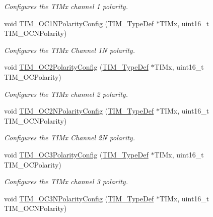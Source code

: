 \begin{DoxyCompactItemize}
\begin{DoxyCompactList}\small\item\em Configures the T\+I\+Mx channel 1 polarity. \end{DoxyCompactList}\item 
void \mbox{\hyperlink{group___t_i_m___exported___functions_ga3cb91578e7dd34ea7d09862482960445}{T\+I\+M\+\_\+\+O\+C1\+N\+Polarity\+Config}} (\mbox{\hyperlink{struct_t_i_m___type_def}{T\+I\+M\+\_\+\+Type\+Def}} $\ast$T\+I\+Mx, uint16\+\_\+t T\+I\+M\+\_\+\+O\+C\+N\+Polarity)
\begin{DoxyCompactList}\small\item\em Configures the T\+I\+Mx Channel 1N polarity. \end{DoxyCompactList}\item 
void \mbox{\hyperlink{group___t_i_m___exported___functions_ga6831cacaac1ef50291af94db94450797}{T\+I\+M\+\_\+\+O\+C2\+Polarity\+Config}} (\mbox{\hyperlink{struct_t_i_m___type_def}{T\+I\+M\+\_\+\+Type\+Def}} $\ast$T\+I\+Mx, uint16\+\_\+t T\+I\+M\+\_\+\+O\+C\+Polarity)
\begin{DoxyCompactList}\small\item\em Configures the T\+I\+Mx channel 2 polarity. \end{DoxyCompactList}\item 
void \mbox{\hyperlink{group___t_i_m___exported___functions_ga2fa6ea3a89f446b52b4e699272b70cad}{T\+I\+M\+\_\+\+O\+C2\+N\+Polarity\+Config}} (\mbox{\hyperlink{struct_t_i_m___type_def}{T\+I\+M\+\_\+\+Type\+Def}} $\ast$T\+I\+Mx, uint16\+\_\+t T\+I\+M\+\_\+\+O\+C\+N\+Polarity)
\begin{DoxyCompactList}\small\item\em Configures the T\+I\+Mx Channel 2N polarity. \end{DoxyCompactList}\item 
void \mbox{\hyperlink{group___t_i_m___exported___functions_ga1ef43b03fe666495e80aac9741ae7ab0}{T\+I\+M\+\_\+\+O\+C3\+Polarity\+Config}} (\mbox{\hyperlink{struct_t_i_m___type_def}{T\+I\+M\+\_\+\+Type\+Def}} $\ast$T\+I\+Mx, uint16\+\_\+t T\+I\+M\+\_\+\+O\+C\+Polarity)
\begin{DoxyCompactList}\small\item\em Configures the T\+I\+Mx channel 3 polarity. \end{DoxyCompactList}\item 
void \mbox{\hyperlink{group___t_i_m___exported___functions_gac710acc5b682e892584fc6f089f61dc2}{T\+I\+M\+\_\+\+O\+C3\+N\+Polarity\+Config}} (\mbox{\hyperlink{struct_t_i_m___type_def}{T\+I\+M\+\_\+\+Type\+Def}} $\ast$T\+I\+Mx, uint16\+\_\+t T\+I\+M\+\_\+\+O\+C\+N\+Polarity)

\end{DoxyCompactItemize}
